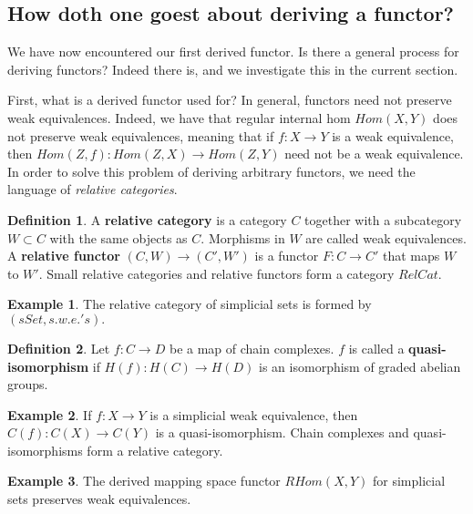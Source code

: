 \documentclass{article}
\theoremstyle{definition}
\newtheorem{ex}{Example}[section]
\newtheorem{defn}{Definition}[section]
\begin{document}
\subsection{How doth one goest about deriving a functor?}
We have now encountered our first derived functor. Is there a general process for deriving functors? Indeed there is, and we investigate this in the current section. 

First, what is a derived functor used for? In general, functors need not preserve weak equivalences. Indeed, we have that regular internal hom $Hom(X,Y)$ does not preserve weak equivalences, meaning that if $f:X\rightarrow Y$ is a weak equivalence, then $Hom(Z,f):Hom(Z,X)\rightarrow Hom(Z,Y)$ need not be a weak equivalence. In order to solve this problem of deriving arbitrary functors, we need the language of \textit{relative categories}.
\begin{defn}
A \textbf{relative category} is a category $C$ together with a subcategory $W\subset C$ with the same objects as $C$. Morphisms in $W$ are called weak equivalences. A \textbf{relative functor} $(C,W)\rightarrow (C',W')$ is a functor $F:C\rightarrow C'$ that maps $W$ to $W'$. Small relative categories and relative functors form a category $RelCat$.
\end{defn}
\begin{ex}
The relative category of simplicial sets is formed by $(sSet,s.w.e.'s).$
\end{ex}
\begin{defn}
Let $f:C\rightarrow D$ be a map of chain complexes. $f$ is called a \textbf{quasi-isomorphism} if $H(f):H(C)\rightarrow H(D)$ is an isomorphism of graded abelian groups. 
\end{defn}
\begin{ex}
If $f:X\rightarrow Y$ is a simplicial weak equivalence, then $C(f):C(X)\rightarrow C(Y)$ is a quasi-isomorphism. Chain complexes and quasi-isomorphisms form a relative category. 
\end{ex}
\begin{ex}
The derived mapping space functor $RHom(X,Y)$ for simplicial sets preserves weak equivalences. 
\end{ex}
\end{document}
